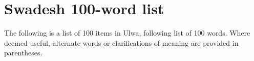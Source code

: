
\chapter{Swadesh 100-word list}\label{sec:app.a}


The following is a list of 100  items in Ulwa, following  list of 100 words. Where deemed useful, alternate words or clarifications of meaning are provided in parentheses.\\

